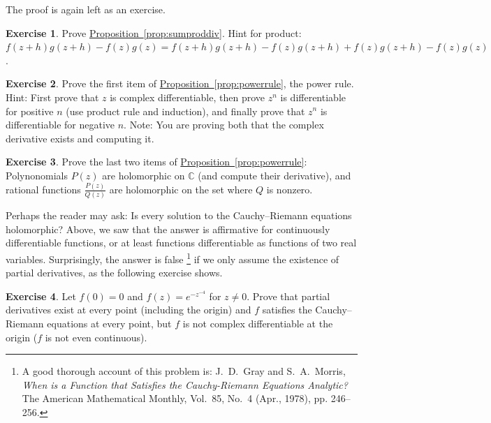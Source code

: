 \documentclass[12pt,openany]{book}
\newcommand{\C}{{\mathbb{C}}}
\theoremstyle{plain}
\theoremstyle{remark}
\theoremstyle{definition}
\newenvironment{exbox}{%
    \def\FrameCommand{\vrule width 1pt \relax\hspace{10pt}}%
    \MakeFramed{\advance\hsize-\width\FrameRestore}%
}{%
    \endMakeFramed
}
\theoremstyle{exercise}
\newtheorem{exercise}{Exercise}[section]
\theoremstyle{example}
\newcommand{\propref}[1]{\hyperref[#1]{Proposition~\ref*{#1}}}
\begin{document}
The proof is again left as an exercise.

\begin{exbox}
\begin{exercise}
Prove \propref{prop:sumproddiv}.
Hint for product: 
$f(z+h)g(z+h) - f(z)g(z) =
f(z+h)g(z+h) - f(z)g(z+h) +
f(z)g(z+h) - f(z)g(z)$.
\end{exercise}

\begin{exercise}
Prove the first item of \propref{prop:powerrule}, the power rule.
Hint: First prove that $z$ is complex differentiable,
then prove $z^n$ is differentiable for positive $n$ (use product rule and
induction), and finally prove
that $z^n$ is differentiable for negative $n$.
Note: You are proving both that the complex derivative exists and
computing it.
\end{exercise}

\begin{exercise}
Prove the last two items of \propref{prop:powerrule}:
Polynonomials $P(z)$ are holomorphic on $\C$ (and compute their derivative),
and rational functions
$\frac{P(z)}{Q(z)}$ are holomorphic on the set where $Q$ is nonzero.
\end{exercise}
\end{exbox}

Perhaps the reader may ask:
Is every solution to
the Cauchy--Riemann equations holomorphic?  Above, we saw that the answer
is affirmative for continuously differentiable functions, or at least
functions differentiable as functions of two real variables.
Surprisingly, the answer is false%
\footnote{%
A good thorough account of this problem is:
J.\ D.\ Gray and  S.\ A.\ Morris,
\emph{When is a Function that Satisfies the Cauchy-Riemann Equations
Analytic?}  The American Mathematical Monthly, Vol.\ 85, No.\ 4 (Apr.,
1978), pp. 246--256.} if we only assume the existence of partial derivatives,
as the following exercise shows.

\begin{exbox}
\begin{exercise} \label{exercise:nonholCRsol}
Let $f(0) = 0$ and $f(z) = e^{-z^{-4}}$ for $z \not=0$.  Prove that partial
derivatives exist at every point (including the origin) and $f$
satisfies the Cauchy--Riemann equations at every point,
but $f$ is not complex differentiable at the origin ($f$ is not
even continuous).
\end{exercise}
\end{exbox}
\end{document}
